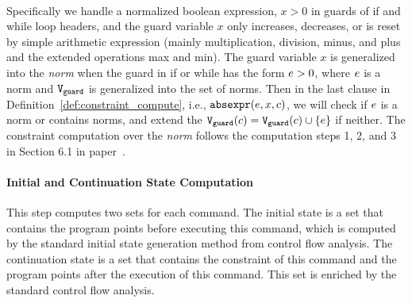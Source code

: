  \\
Specifically 
we handle a 
normalized boolean expression, $x > 0$
in guards of if and while loop headers, and 
the guard variable $x$ only increases, decreases, or is reset by 
simple arithmetic expression (mainly multiplication, division, minus, and plus and the extended operations max and min). 
The guard variable $x$ is generalized into the \emph{norm} when the guard 
in if or while has the form $e > 0$, where $e$ is a norm and $\mathtt{V}_{\mathtt{guard}}$ is generalized into the set of norms.
Then in the last clause in Definition~\ref{def:constraint_compute}, i.e., $\mathtt{abs}{\mathtt{expr}}(e, x, c)$,
we will check if $e$ is a norm or contains norms, and extend the $\mathtt{V}_{\mathtt{guard}}(c)= \mathtt{V}_{\mathtt{guard}}(c)\cup \{e\}$ if neither.
The constraint computation over the \emph{norm} follows the computation steps 1, 2, and 3 in Section 6.1 in paper~\cite{SinnZV17}. 
%
\paragraph{Initial and Continuation State Computation}
This step computes two sets for each command. 
The initial state is a set that contains the
program points before executing this command, which is computed by the standard initial state generation method from control flow analysis.
The continuation state is a set
that contains the constraint of this command and the program points after the execution of this command.
This set is enriched 
by the standard control flow analysis.

